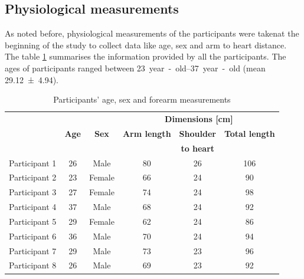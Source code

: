 \subsection{Physiological measurements}
\label{section procedure 1.2}
As noted before, physiological measurements of the participants were takenat the beginning of the study to collect data like age, sex and arm to heart distance. The table \ref{tbl:physiological} summarises the information provided by all the participants. The ages of participants ranged between \SIrange{23}{37}{year-old} (mean \num{29.12(494)}). 

\begin{table}[!ht] %
	\caption{Participants' age, sex and forearm measurements}
	\label{tbl:physiological}
	\centering
	\begin{tabular}{lcc|ccc}
		\toprule
		&&&         \multicolumn{3}{c}{\textbf{Dimensions [\si{\cm}]}}         \\
		& \textbf{Age} & \textbf{Sex} & \textbf{Arm length} & \textbf{Shoulder} & \textbf{Total length} \\
		&&&&  \textbf{to heart}   &                       \\ \midrule
		Participant 1 &      26      &     Male     &         80          &          26          &          106          \\
		Participant 2 &      23      &    Female    &         66          &          24          &          90           \\
		Participant 3 &      27      &    Female    &         74          &          24          &          98           \\
		Participant 4 &      37      &     Male     &         68          &          24          &          92           \\
		Participant 5 &      29      &    Female    &         62          &          24          &          86           \\
		Participant 6 &      36      &     Male     &         70          &          24          &          94           \\
		Participant 7 &      29      &     Male     &         73          &          23          &          96           \\
		Participant 8 &      26      &     Male     &         69          &          23          &          92           \\ \bottomrule
	\end{tabular}
\end{table}


